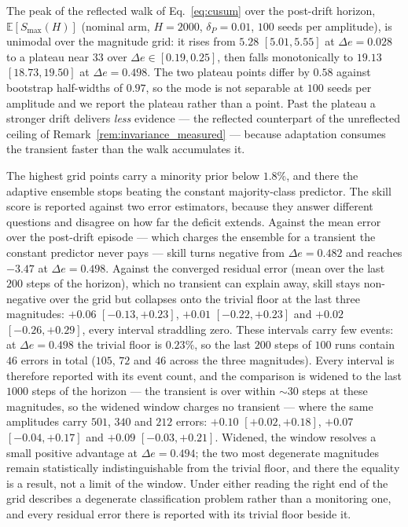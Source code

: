 \begin{empresult}\label{res:bell}
  The peak of the reflected walk of Eq.~\eqref{eq:cusum} over the post-drift
  horizon, $\mathbb{E}[S_{\max}(H)]$ (nominal arm, $H = 2000$,
  $\delta_P = 0.01$, $100$ seeds per amplitude), is unimodal over the
  magnitude grid: it rises from $5.28$ $[5.01, 5.55]$ at $\Delta e = 0.028$
  to a plateau near $33$ over $\Delta e \in [0.19, 0.25]$, then falls
  monotonically to $19.13$ $[18.73, 19.50]$ at $\Delta e = 0.498$. The two
  plateau points differ by $0.58$ against bootstrap half-widths of $0.97$,
  so the mode is not separable at $100$ seeds per amplitude and we report
  the plateau rather than a point. Past the plateau a stronger drift
  delivers \emph{less} evidence --- the reflected counterpart of the
  unreflected ceiling of Remark~\ref{rem:invariance_measured} --- because
  adaptation consumes the transient faster than the walk accumulates it.
\end{empresult}

\begin{empresult}\label{res:skillfloor}
  The highest grid points carry a minority prior below $1.8\%$, and there
  the adaptive ensemble stops beating the constant majority-class
  predictor. The skill score is reported against two error estimators,
  because they answer different questions and disagree on how far the
  deficit extends. Against the mean error over the post-drift episode ---
  which charges the ensemble for a transient the constant predictor never
  pays --- skill turns negative from $\Delta e = 0.482$ and reaches $-3.47$
  at $\Delta e = 0.498$. Against the converged residual error (mean over
  the last $200$ steps of the horizon), which no transient can explain
  away, skill stays non-negative over the grid but collapses onto the
  trivial floor at the last three magnitudes: $+0.06$ $[-0.13, +0.23]$,
  $+0.01$ $[-0.22, +0.23]$ and $+0.02$ $[-0.26, +0.29]$, every interval
  straddling zero. These intervals carry few events: at $\Delta e = 0.498$
  the trivial floor is $0.23\%$, so the last $200$ steps of $100$ runs
  contain $46$ errors in total ($105$, $72$ and $46$ across the three
  magnitudes). Every interval is therefore reported with its event count,
  and the comparison is widened to the last $1000$ steps of the horizon ---
  the transient is over within $\sim 30$ steps at these magnitudes, so the
  widened window charges no transient --- where the same amplitudes carry
  $501$, $340$ and $212$ errors: $+0.10$ $[+0.02, +0.18]$, $+0.07$
  $[-0.04, +0.17]$ and $+0.09$ $[-0.03, +0.21]$. Widened, the window
  resolves a small positive advantage at $\Delta e = 0.494$; the two most
  degenerate magnitudes remain statistically indistinguishable from the
  trivial floor, and there the equality is a result, not a limit of the
  window. Under either reading the right end of the grid describes
  a degenerate classification problem rather than a monitoring one, and
  every residual error there is reported with its trivial floor beside it.
\end{empresult}

